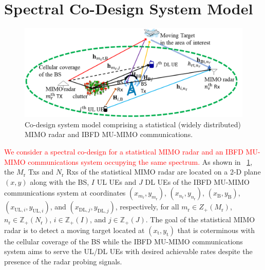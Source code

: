 \documentclass[10pt,journal]{IEEEtran}
\newcommand{\paren}[1]{\left({#1}\right)}
\theoremstyle{definition}
\begin{document}
	\section{Spectral Co-Design System Model}
	\label{sec:system}
	\begin{figure}[t]
		\centering
		\includegraphics[width=1\columnwidth]{setup_model_tsp.png}
		\caption{Co-design system model comprising a statistical (widely distributed) MIMO radar and IBFD MU-MIMO communications.}
		\label{fig:setup}
	\end{figure}
	\textcolor{red}{We consider a spectral co-design for a statistical MIMO radar and an IBFD MU-MIMO communications system occupying the same spectrum.} As shown in \figurename{~\ref{fig:setup}}, the $M_\mathrm{r}$ Txs and $N_\mathrm{r}$ Rxs of the statistical MIMO radar are located on a 2-D plane $\left(x,y \right)$ along with the BS, $I$ UL UEs and $J$ DL UEs of the IBFD MU-MIMO communications system at coordinates $\left(x_{m_\mathrm{r}},y_{m_\mathrm{r}}\right)$, $\left(x_{n_\mathrm{r}},y_{n_\mathrm{r}} \right)$,  $\paren{x_{\mathrm{B}},y_{\mathrm{B}}}$, $\paren{x_{\mathrm{UL},i},y_{\mathrm{UL},i}}$, and $\paren{x_{\mathrm{DL,}j},y_{\mathrm{DL},j}}$, respectively, for all $m_\mathrm{r}\in{Z}_{+}(M_\mathrm{r})$, $n_\mathrm{r}\in\mathbb{Z}_{+}\paren{N_\mathrm{r}}$, $i\in\mathbb{Z}_{+}\paren{I}$, and $j\in\mathbb{Z}_{+}\paren{J}$. The goal of the statistical MIMO radar is to detect a moving target located at $(x_{\mathrm{t}},y_{\mathrm{t}})$ that is coterminous with the cellular coverage of the BS while the IBFD MU-MIMO communications system aims to serve the UL/DL UEs with desired achievable rates despite the presence of the radar probing signals.  %
\end{document}
